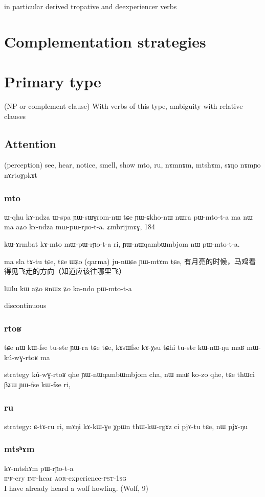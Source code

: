 \documentclass[oldfontcommands,oneside,a4paper,11pt]{article}
\newcommand{\ipa}[1]{{\phon #1}} %
\begin{document}
in particular derived tropative and deexperiencer verbs

 \section{Complementation strategies} 
\section{Primary type} 
(NP or complement clause)
 With verbs of this type, ambiguity with relative clauses
\subsection{Attention} 
 (perception)
 see, hear, notice, smell, show 
\ipa{mto}, \ipa{ru}, \ipa{nɤmnɤm}, \ipa{mtshɤm}, \ipa{sɤŋo} nɤmɲo nɤrtoχpkɤt

\subsubsection{mto}

ɯ-qhu kɤ-ndza ɯ-spa ɲɯ-sɯɣrom-nɯ tɕe ɲɯ-ɕkho-nɯ nɯra pɯ-mto-t-a ma
nɯ ma aʑo kɤ-ndza mɯ-pɯ-rɲo-t-a.
ʑmbrijmɤɣ, 184

kɯ-ɤrmbat kɤ-mto mɯ-pɯ-rɲo-t-a ri,
ɲɯ-nɯqambɯmbjom nɯ pɯ-mto-t-a.

ma sla tɤ-tu tɕe, tɕe ɯʑo (qarma) ju-nɯɕe ɲɯ-mtɤm tɕe, 
有月亮的时候，马鸡看得见飞走的方向（知道应该往哪里飞）


lɯlu kɯ aʑo ʁnɯz ʑo ka-ndo pɯ-mto-t-a

discontinuous



  \subsubsection{rtoʁ}
tɕe nɯ kɯ-fse tu-ste ɲɯ-ra tɕe tɕe,
kɤsɯfse kɤ-χsu tɕhi tu-ste kɯ-nɯ-ŋu maʁ mɯ-kú-wɣ-rtoʁ ma  
 
 
 strategy   	kú-wɣ-rtoʁ qhe ɲɯ-nɯqambɯmbjom cha,
nɯ maʁ ko-zo qhe, tɕe thɯci βʑɯ ɲɯ-fse kɯ-fse ri,

\subsubsection{ru}
strategy:
ɕ-tɤ-ru ri,
mɤŋi kɤ-kɯ-ɣe χpɯn thɯ-kɯ-rgɤz ci pjɤ-tu tɕe, nɯ pjɤ-ŋu




\subsubsection{mtsʰɤm}
		 \begin{exe}
\ex \label{ex:mtsham2}
 \gll   	\ipa{tu-ɣɤwu}    	\ipa{ kɤ-mtshɤm}   	\ipa{pɯ-rɲo-t-a}     	 \\
 \textsc{ipf}-cry   \textsc{inf}-hear \textsc{aor}-experience-\textsc{pst}-\textsc{1sg} \\
 \glt I have already heard a wolf howling. (Wolf, 9)
\end{exe} 
 		
\end{document}
